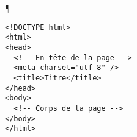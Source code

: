 \documentclass[hyperref=dvips,11pt,svgnames, smaller,  aspectratio=169]{beamer}
\begin{document}
\begin{frame}[containsverbatim]¶
	\begin{block}{}
\begin{lstlisting}
<!DOCTYPE html>
<html>
<head>
  <!-- En-tête de la page -->
  <meta charset="utf-8" />
  <title>Titre</title>
</head>
<body>
  <!-- Corps de la page -->
</body>
</html>
\end{lstlisting}
\end{block}
\end{frame}



\end{document}

